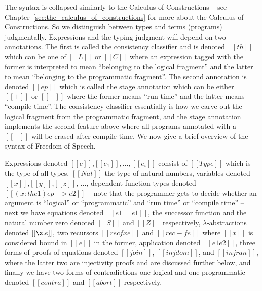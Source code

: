 The syntax is collapsed similarly to the Calculus of Constructions --
see Chapter~\ref{sec:the_calculus_of_constructions} for more about the
Calculus of Constructions. So we distinguish between types and terms
(programs) judgmentally.  Expressions and the typing judgment will
depend on two annotations.  The first is called the consistency
classifier and is denoted $[[th]]$ which can be one of $[[L]]$ or
$[[C]]$ where an expression tagged with the former is interpreted to
mean ``belonging to the logical fragment'' and the latter to mean
``belonging to the programmatic fragment''.  The second annotation is
denoted $[[ep]]$ which is called the stage annotation which can be
either $[[+]]$ or $[[-]]$ where the former means ``run time'' and the
latter means ``compile time''. The consistency classifier essentially
is how we carve out the logical fragment from the programmatic
fragment, and the stage annotation implements the second feature above
where all programs annotated with a $[[-]]$ will be erased after
compile time.  We now give a brief overview of the syntax of Freedom
of Speech.

Expressions denoted $[[e]]$,$[[e_1]],\ldots,[[e_i]]$ consist of
$[[Type]]$ which is the type of all types, $[[Nat]]$ the type of
natural numbers, variables denoted $[[x]]$,$[[y]]$,$[[z]]$, $\ldots$,
dependent function types denoted $[[(x : th e1) ep -> e2]]$ -- note that
the programmer gets to decide whether an argument is ``logical'' or
``programmatic'' and ``run time'' or ``compile time'' -- next we have
equations denoted $[[e1 = e1]]$, the successor function and the
natural number zero denoted $[[S]]$ and $[[Z]]$ respectively,
$\lambda$-abstractions denoted $[[\x.e]]$, two recursors $[[rec f x
e]]$ and $[[rec - f e]]$ where $[[x]]$ is considered bound in $[[e]]$
in the former, application denoted $[[e1 e2]]$, three forms of proofs
of equations denoted $[[join]]$, $[[injdom]]$, and $[[injran]]$, where
the latter two are injectivity proofs and are discussed further below,
and finally we have two forms of contradictions one logical and one
programmatic denoted $[[contra]]$ and $[[abort]]$ respectively.

